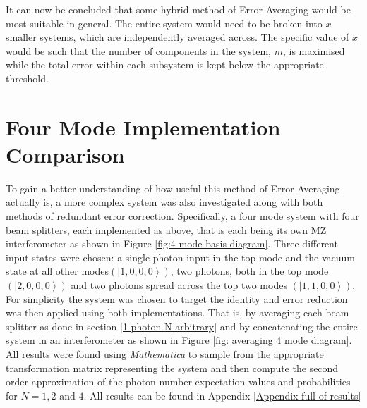 \documentclass[aps,pra,twocolumn,superscriptaddress,numerical,floatfix]{revtex4-1}
\begin{document}
It can now be concluded that some hybrid method of Error Averaging would be most suitable in general. The entire system would need to be broken into $x$ smaller systems, which are independently averaged across. The specific value of $x$ would be such that the number of components in the system, $m$, is maximised while the total error within each subsystem is kept below the appropriate threshold.

\section{Four Mode Implementation Comparison \label{Four Mode Impementation Comparison}}

To gain a better understanding of how useful this method of Error Averaging actually is, a more complex system was also investigated along with both methods of redundant error correction. Specifically, a four mode system with four beam splitters, each implemented as above, that is each being its own MZ interferometer as shown in Figure \ref{fig:4 mode basis diagram}. Three different input states were chosen: a single photon input in the top mode and the vacuum state at all other modes$\left(\left|1,0,0,0\right\rangle \right)$, two photons, both in the top mode $\left(\left|2,0,0,0\right\rangle \right)$ and two photons spread across the top two modes $\left(\left|1,1,0,0\right\rangle \right)$. For simplicity the system was chosen to target the identity and error reduction was then applied using both implementations. That is, by averaging each beam splitter as done in section \ref{1 photon N arbitrary} and by concatenating the entire system in an interferometer as shown in Figure \ref{fig: averaging 4 mode diagram}. All results were found using \textit{Mathematica} to sample from the appropriate transformation matrix representing the system and then compute the second order approximation of the photon number expectation values and probabilities for $N=1, 2 \textrm{ and } 4$. All results can be found in Appendix \ref{Appendix full of results}
\end{document}
